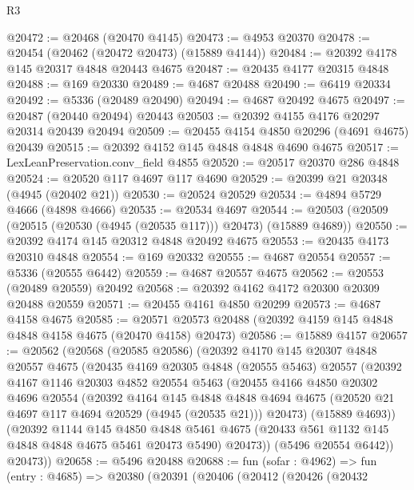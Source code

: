 \begin{lexlean}{R3}
\begin{coremodule}
@20472 := @20468 (@20470 @4145)
@20473 := @4953 @20370
@20478 := @20454 (@20462 (@20472 @20473) (@15889 @4144))
@20484 := @20392 @4178 @145 @20317 @4848 @20443 @4675
@20487 := @20435 @4177 @20315 @4848
@20488 := @169 @20330
@20489 := @4687 @20488
@20490 := @6419 @20334
@20492 := @5336 (@20489 @20490)
@20494 := @4687 @20492 @4675
@20497 := @20487 (@20440 @20494) @20443
@20503 := @20392 @4155 @4176 @20297 @20314 @20439 @20494
@20509 := @20455 @4154 @4850 @20296 (@4691 @4675) @20439
@20515 := @20392 @4152 @145 @4848 @4848 @4690 @4675
@20517 := LexLeanPreservation.conv_field @4855
@20520 := @20517 @20370 @286 @4848
@20524 := @20520 @117 @4697 @117 @4690
@20529 := @20399 @21 @20348 (@4945 (@20402 @21))
@20530 := @20524 @20529
@20534 := @4894 @5729 @4666 (@4898 @4666)
@20535 := @20534 @4697
@20544 := @20503 (@20509 (@20515 (@20530 (@4945 (@20535 @117))) @20473) (@15889 @4689))
@20550 := @20392 @4174 @145 @20312 @4848 @20492 @4675
@20553 := @20435 @4173 @20310 @4848
@20554 := @169 @20332
@20555 := @4687 @20554
@20557 := @5336 (@20555 @6442)
@20559 := @4687 @20557 @4675
@20562 := @20553 (@20489 @20559) @20492
@20568 := @20392 @4162 @4172 @20300 @20309 @20488 @20559
@20571 := @20455 @4161 @4850 @20299
@20573 := @4687 @4158 @4675
@20585 := @20571 @20573 @20488 (@20392 @4159 @145 @4848 @4848 @4158 @4675 (@20470 @4158) @20473)
@20586 := @15889 @4157
@20657 := @20562
    (@20568
      (@20585 @20586)
      (@20392
        @4170
        @145
        @20307
        @4848
        @20557
        @4675
        (@20435
          @4169
          @20305
          @4848
          (@20555 @5463)
          @20557
          (@20392
            @4167
            @1146
            @20303
            @4852
            @20554
            @5463
            (@20455
              @4166
              @4850
              @20302
              @4696
              @20554
              (@20392
                @4164
                @145
                @4848
                @4848
                @4694
                @4675
                (@20520 @21 @4697 @117 @4694 @20529 (@4945 (@20535 @21)))
                @20473)
              (@15889 @4693))
            (@20392
              @1144
              @145
              @4850
              @4848
              @5461
              @4675
              (@20433 @561 @1132 @145 @4848 @4848 @4675 @5461 @20473 @5490)
              @20473))
          (@5496 @20554 @6442))
        @20473))
@20658 := @5496 @20488
@20688 := fun (sofar : @4962) =>
  fun (entry : @4685) =>
  @20380
    (@20391
      (@20406
        (@20412
          (@20426
            (@20432

\end{coremodule}
\end{lexlean}
